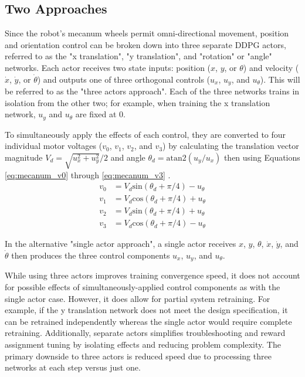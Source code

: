 \subsection{Two Approaches}
Since the robot's mecanum wheels permit omni-directional movement, position and orientation control can be broken down into three separate DDPG actors, referred to as the "x translation", "y translation", and "rotation" or "angle" networks. Each actor receives two state inputs: position ($x$, $y$, or $\theta$) and velocity ($\dot{x}$, $\dot{y}$, or $\dot{\theta}$) and outputs one of three orthogonal controls ($u_x$, $u_y$, and $u_\theta$). This will be referred to as the "three actors approach". Each of the three networks trains in isolation from the other two; for example, when training the x translation network, $u_y$ and $u_\theta$ are fixed at 0.

To simultaneously apply the effects of each control, they are converted to four individual motor voltages ($v_0$, $v_1$, $v_2$, and $v_3$) by calculating the translation vector magnitude $V_d = \sqrt{u_x^2 + u_y^2}/2$ and angle $\theta_d = \text{atan2}(u_y / u_x)$ then using Equations \ref{eq:mecanum_v0} through \ref{eq:mecanum_v3} \cite{li_2018}\cite{rahman_2014}. 
\begin{align}
v_0 &= V_d \text{sin}(\theta_d + \pi/4) - u_\theta  \label{eq:mecanum_v0}\\
v_1 &= V_d \text{cos}(\theta_d + \pi/4) + u_\theta  \label{eq:mecanum_v1}\\
v_2 &= V_d \text{sin}(\theta_d + \pi/4) + u_\theta  \label{eq:mecanum_v2}\\
v_3 &= V_d \text{cos}(\theta_d + \pi/4) - u_\theta  \label{eq:mecanum_v3}
\end{align}

In the alternative "single actor approach", a single actor receives $x$, $y$, $\theta$, $\dot{x}$, $\dot{y}$, and $\dot{\theta}$ then produces the three control components $u_x$, $u_y$, and $u_\theta$. 

While using three actors improves training convergence speed, it does not account for possible effects of simultaneously-applied control components as with the single actor case. However, it does allow for partial system retraining. For example, if the y translation network does not meet the design specification, it can be retrained independently whereas the single actor would require complete retraining. Additionally, separate actors simplifies troubleshooting and reward assignment tuning by isolating effects and reducing problem complexity. The primary downside to three actors is reduced speed due to processing three networks at each step versus just one. 

